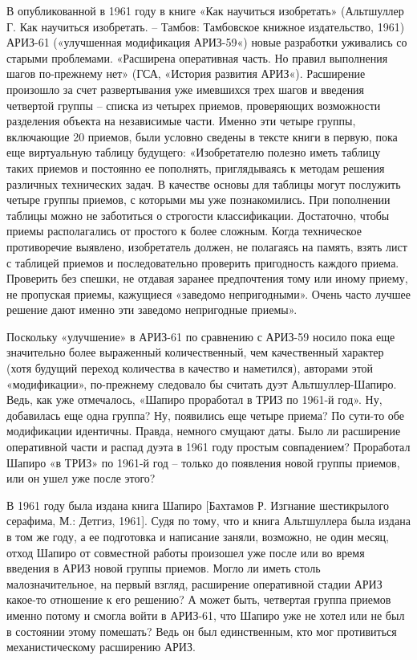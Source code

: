 \documentclass[11pt,a4paper]{article}
\begin{document}
В опубликованной в 1961 году в книге «Как научиться изобретать» (Альтшуллер
Г. Как научиться изобретать. -- Тамбов: Тамбовское книжное издательство, 1961)
АРИЗ-61 («улучшенная модификация АРИЗ-59«) новые разработки уживались со
старыми проблемами. «Расширена оперативная часть. Но правил выполнения шагов
по-прежнему нет» (ГСА, «История развития АРИЗ«). Расширение произошло за счет
развертывания уже имевшихся трех шагов и введения четвертой группы -- списка
из четырех приемов, проверяющих возможности разделения объекта на независимые
части. Именно эти четыре группы, включающие 20 приемов, были условно сведены в
тексте книги в первую, пока еще виртуальную таблицу будущего: «Изобретателю
полезно иметь таблицу таких приемов и постоянно ее пополнять, приглядываясь к
методам решения различных технических задач. В качестве основы для таблицы
могут послужить четыре группы приемов, с которыми мы уже познакомились. При
пополнении таблицы можно не заботиться о строгости классификации. Достаточно,
чтобы приемы располагались от простого к более сложным. Когда техническое
противоречие выявлено, изобретатель должен, не полагаясь на память, взять лист
с таблицей приемов и последовательно проверить пригодность каждого
приема. Проверить без спешки, не отдавая заранее предпочтения тому или иному
приему, не пропуская приемы, кажущиеся «заведомо непригодными». Очень часто
лучшее решение дают именно эти заведомо непригодные приемы».

Поскольку «улучшение» в АРИЗ-61 по сравнению с АРИЗ-59 носило пока еще
значительно более выраженный количественный, чем качественный характер (хотя
будущий переход количества в качество и наметился), авторами этой
«модификации», по-прежнему следовало бы считать дуэт Альтшуллер-Шапиро. Ведь,
как уже отмечалось, «Шапиро проработал в ТРИЗ по 1961-й год». Ну, добавилась
еще одна группа? Ну, появились еще четыре приема? По сути-то обе модификации
идентичны. Правда, немного смущают даты. Было ли расширение оперативной части
и распад дуэта в 1961 году простым совпадением? Проработал Шапиро «в ТРИЗ» по
1961-й год -- только до появления новой группы приемов, или он ушел уже после
этого?

В 1961 году была издана книга Шапиро [Бахтамов Р. Изгнание шестикрылого
  серафима, М.: Детгиз, 1961]. Судя по тому, что и книга Альтшуллера была
издана в том же году, а ее подготовка и написание заняли, возможно, не один
месяц, отход Шапиро от совместной работы произошел уже после или во время
введения в АРИЗ новой группы приемов. Могло ли иметь столь малозначительное,
на первый взгляд, расширение оперативной стадии АРИЗ какое-то отношение к его
решению? А может быть, четвертая группа приемов именно потому и смогла войти в
АРИЗ-61, что Шапиро уже не хотел или не был в состоянии этому помешать? Ведь
он был единственным, кто мог противиться механистическому расширению АРИЗ.
\end{document}
